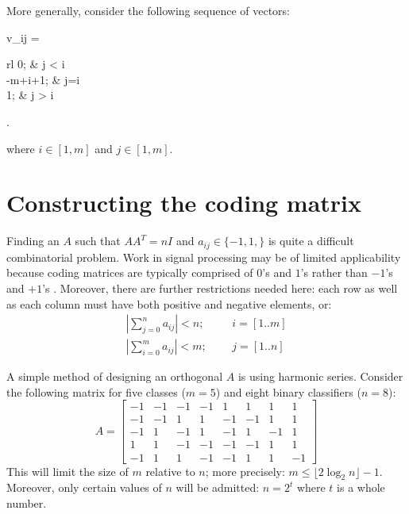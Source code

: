 More generally, consider the following sequence of vectors:
\begin{eqnnon}
	v_{ij} =  \left \lbrace \begin{array}{rl}
			0; & j < i \\
			-m+i+1; & j=i \\
			1; & j > i
		\end{array} \right .
\end{eqnnon}
where $i \in [1, m]$ and $j \in [1, m]$. \citep{Boyd_Vandenberghe2004}


\section{Constructing the coding matrix}

\label{construction}

Finding an $A$ such that $A A^T = n I$ and $a_{ij} \in \lbrace -1, 1, \rbrace$
is quite a difficult combinatorial problem.
Work in signal processing may be of limited applicability because coding
matrices are typically comprised of $0$'s and $1$'s 
rather than $-1$'s and $+1$'s \citep{Hedayat_etal1999,Panse_etal2014}.
Moreover, there are further restrictions needed here: 
each row as well as each column must have
both positive and negative elements, or:
\begin{eqnarray}
	\left | \sum_{j=0}^n a_{ij} \right | < n; & ~~~ & i=[1..m] \label{restriction}\\\nonumber
	\left | \sum_{i=0}^m a_{ij} \right | < m; & ~~~ & j=[1..n] 
\end{eqnarray}

A simple method of designing an orthogonal $A$ is using harmonic series.
Consider the following matrix for five classes ($m=5$) 
and eight binary classifiers ($n=8$):
\begin{equation}
	A = \left [ \begin{array}{rrrrrrrr}
			-1 & -1 & -1 & -1 & 1 & 1 & 1 & 1 \\
			-1 & -1 & 1 & 1 & -1 & -1 & 1 & 1 \\
			-1 & 1 & -1 & 1 & -1 & 1 & -1 & 1 \\
			 1 &  1 & -1 & -1 & -1 & -1 & 1 & 1 \\
			-1 & 1 & 1 & -1 & -1 & 1 & 1 & -1 
	\end{array} \right ]
	\label{harmonic}
\end{equation}
This will limit the size of $m$ relative to $n$; more precisely:
$m \le \lfloor 2 \log_2 n \rfloor - 1$. Moreover, only certain values of $n$
will be admitted: $n=2^t$ where $t$ is a whole number.

